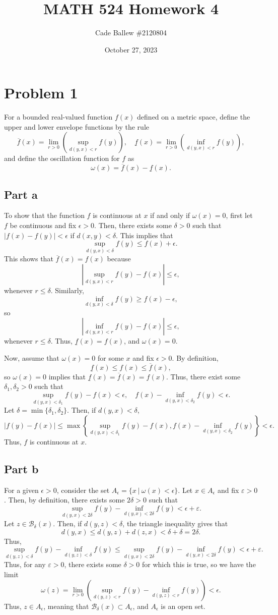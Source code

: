 \documentclass{article}
\title{MATH 524 Homework 4}
\author{Cade Ballew \#2120804}
\date{October 27, 2023}
\begin{document}
	
\maketitle
	
\section{Problem 1}
For a bounded real-valued function $f(x)$ defined on a metric space, define the upper and lower envelope functions by the rule
\[
\overline f(x)=\lim_{r>0}\left(\sup_{d(y,x)<r}f(y)\right),\quad \underline f(x)=\lim_{r>0}\left(\inf_{d(y,x)<r}f(y)\right),
\]
and define the oscillation function for $f$ as
\[
\omega(x)=\overline f(x)-\underline f(x).
\]

\subsection{Part a}
To show that the function $f$ is continuous at $x$ if and only if $\omega(x)=0$, first let $f$ be continuous and fix $\epsilon>0$. Then, there exists some $\delta>0$ such that $|f(x)-f(y)|<\epsilon$ if $d(x,y)<\delta$. This implies that
\[
\sup_{d(y,x)<\delta}f(y)\leq f(x)+\epsilon.
\]
This shows that $\overline{f}(x)=f(x)$ because
\[
\left|\sup_{d(y,x)<r}f(y)- f(x)\right|\leq\epsilon,
\]
whenever $r\leq\delta$. Similarly, 
\[
\inf_{d(y,x)<\delta}f(y)\geq f(x)-\epsilon,
\]
so 
\[
\left|\inf_{d(y,x)<r}f(y)- f(x)\right|\leq\epsilon,
\]
whenever $r\leq\delta$. Thus, $\underline{f}(x)=f(x)$, and $\omega(x)=0$.

Now, assume that $\omega(x)=0$ for some $x$ and fix $\epsilon>0$. By definition,
\[
\underline{f}(x)\leq f(x)\leq\overline{f}(x),
\]
so $\omega(x)=0$ implies that $\underline{f}(x)=\overline{f}(x)=f(x)$. Thus, there exist some $\delta_1,\delta_2>0$ such that
\[
\sup_{d(y,x)<\delta_1}f(y)-f(x)<\epsilon,\quad f(x)-\inf_{d(y,x)<\delta_2}f(y)<\epsilon.
\]
Let $\delta=\min\{\delta_1,\delta_2\}$. Then, if $d(y,x)<\delta$, 
\[
|f(y)-f(x)|\leq\max\left\{\sup_{d(y,x)<\delta_1}f(y)-f(x),f(x)-\inf_{d(y,x)<\delta_2}f(y)\right\}<\epsilon.
\]
Thus, $f$ is continuous at $x$. 

\subsection{Part b}
For a given $\epsilon>0$, consider the set $A_\epsilon=\{x~|~\omega(x)<\epsilon\}$. Let $x\in A_\epsilon$ and fix $\varepsilon>0$. Then, by definition, there exists some $2\delta>0$ such that
\[
\sup_{d(y,x)<2\delta}f(y)-\inf_{d(y,x)<2\delta}f(y)<\epsilon+\varepsilon.
\]
Let $z\in\mathcal B_{\delta}(x).$ Then, if $d(y,z)<\delta$, the triangle inequality gives that 
\[
d(y,x)\leq d(y,z)+d(z,x)<\delta+\delta=2\delta.
\]
Thus,
\[
\sup_{d(y,z)<\delta}f(y)-\inf_{d(y,z)<\delta}f(y)\leq\sup_{d(y,x)<2\delta}f(y)-\inf_{d(y,x)<2\delta}f(y)<\epsilon+\varepsilon.
\]
Thus, for any $\varepsilon>0$, there exists some $\delta>0$ for which this is true, so we have the limit
\[
\omega(z)=\lim_{r>0}\left(\sup_{d(y,z)<r}f(y)-\inf_{d(y,z)<r}f(y)\right)<\epsilon.
\]
Thus, $z\in A_\epsilon$, meaning that $\mathcal B_\delta(x)\subset A_\epsilon$, and $A_\epsilon$ is an open set.
\end{document}
